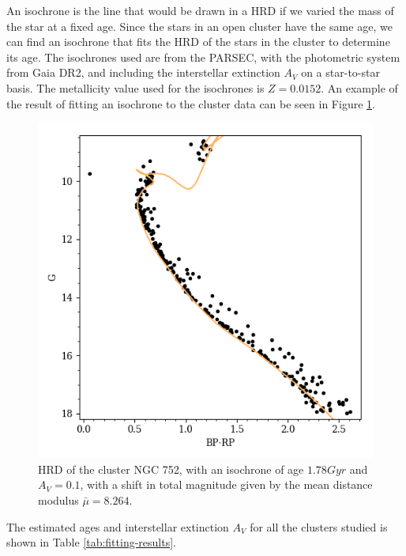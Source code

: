 \documentclass[twocolumn]{revtex4}
\begin{document}
An isochrone is the line that would be drawn in a HRD if we varied the mass of the star at a fixed age. Since the stars in an open cluster have the same age, we can find an isochrone that fits the HRD of the stars in the cluster to determine its age.
The isochrones used are from the PARSEC\cite{parsec}, with the photometric system from Gaia DR2\cite{gaiadr2}, and including the interstellar extinction $A_V$ on a star-to-star basis\cite{girardi}. The metallicity value used for the isochrones is $Z = 0.0152$.  An example of the result of fitting an isochrone to the cluster data can be seen in Figure \ref{nice-isochrone}.

\begin{figure}[h!]
\centering
\includegraphics[scale=0.65]{NGC_752}
\caption{HRD of the cluster NGC 752, with an isochrone of age $1.78 \si{Gyr}$ and $A_V = 0.1$, with a shift in total magnitude given by the mean distance modulus $\bar{\mu} = 8.264$.}
\label{nice-isochrone}
\end{figure}

The estimated ages and interstellar extinction $A_V$ for all the clusters studied is shown in Table \ref{tab:fitting-results}.
\end{document}
